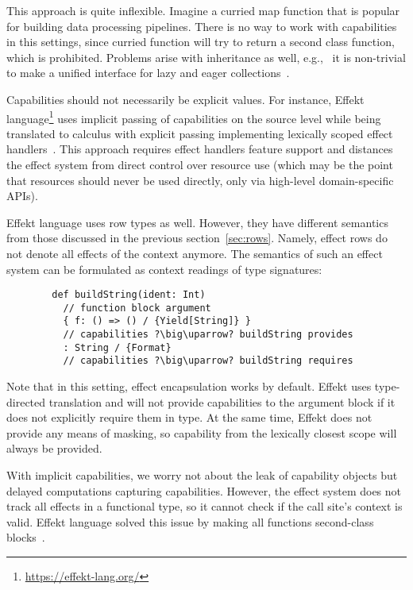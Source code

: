 \documentclass[conference]{IEEEtran}
\begin{document}
    This approach is quite inflexible.
    Imagine a curried map function that is popular for building data processing pipelines.
    There is no way to work with capabilities in this settings, since curried function will try to return a second class function, which is prohibited.
    Problems arise with inheritance as well, e.g., \ it is non-trivial to make a unified interface for lazy and eager collections~\cite{osvald2016gentrification}.

    Capabilities should not necessarily be explicit values.
    For instance, Effekt language\footnote{\url{https://effekt-lang.org/}} uses implicit passing of capabilities on the source level while being translated to calculus with explicit passing implementing lexically scoped effect handlers~\cite{brachthauser2020effects}.
    This approach requires effect handlers feature support and distances the effect system from direct control over resource use (which may be the point that resources should never be used directly, only via high-level domain-specific APIs).

    Effekt language uses row types as well.
    However, they have different semantics from those discussed in the previous section~\ref{sec:rows}.
    Namely, effect rows do not denote all effects of the context anymore.
    The semantics of such an effect system can be formulated as context readings of type signatures:
    \begin{verbatim}
        def buildString(ident: Int)
          // function block argument
          { f: () => () / {Yield[String]} }
          // capabilities ?\big\uparrow? buildString provides
          : String / {Format}
          // capabilities ?\big\uparrow? buildString requires
    \end{verbatim}

    Note that in this setting, effect encapsulation works by default.
    Effekt uses type-directed translation and will not provide capabilities to the argument block if it does not explicitly require them in type.
    At the same time, Effekt does not provide any means of masking, so capability from the lexically closest scope will always be provided.


    With implicit capabilities, we worry not about the leak of capability objects but delayed computations capturing capabilities.
    However, the effect system does not track all effects in a functional type, so it cannot check if the call site's context is valid.
    Effekt language solved this issue by making all functions second-class blocks~\cite{brachthauser2020effects}.
\end{document}

